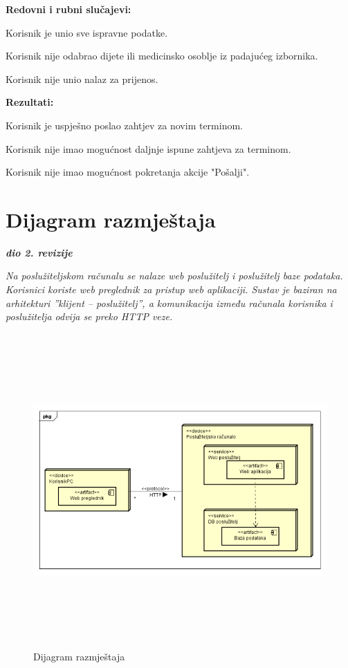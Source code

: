 \noindent \textbf{Redovni i rubni slučajevi:}
\begin{packed_enum}
	\item Korisnik je unio sve ispravne podatke.
	\item Korisnik nije odabrao dijete ili medicinsko osoblje iz padajućeg izbornika.
	\item Korisnik nije unio nalaz za prijenos.
\end{packed_enum}

\noindent \textbf{Rezultati:}
\begin{packed_enum}
	\item Korisnik je uspješno poslao zahtjev za novim terminom.
	\item Korisnik nije imao mogućnost daljnje ispune zahtjeva za terminom.
	\item Korisnik nije imao mogućnost pokretanja akcije "Pošalji".
\end{packed_enum}


\eject 
		
		
		\section{Dijagram razmještaja}
			
			\textbf{\textit{dio 2. revizije}}
			
			 \textit{Na poslužiteljskom računalu se nalaze web poslužitelj i poslužitelj baze podataka. Korisnici koriste web preglednik za pristup web aplikaciji. Sustav je baziran na arhitekturi ”klijent – poslužitelj”, a komunikacija između računala korisnika i poslužitelja odvija se preko HTTP veze.}
			
			\begin{figure}[H]
				\includegraphics[width=15cm, height=12cm]{dijagrami/dijagram_razmjestaja.png}
				\caption{Dijagram razmještaja}
				\label{fig:classD}
			\end{figure}
			
